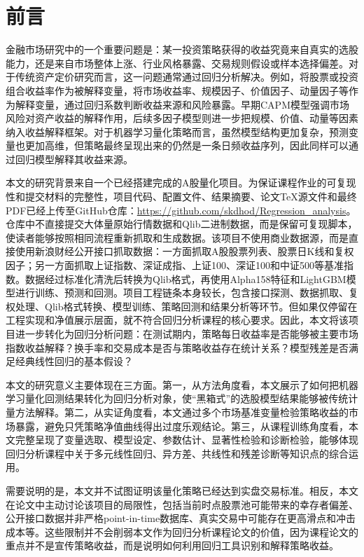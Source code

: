 \documentclass[UTF8,a4paper,12pt]{ctexart}
\begin{document}
\section{前言}
金融市场研究中的一个重要问题是：某一投资策略获得的收益究竟来自真实的选股能力，还是来自市场整体上涨、行业风格暴露、交易规则假设或样本选择偏差。对于传统资产定价研究而言，这一问题通常通过回归分析解决。例如，将股票或投资组合收益率作为被解释变量，将市场收益率、规模因子、价值因子、动量因子等作为解释变量，通过回归系数判断收益来源和风险暴露。早期CAPM模型强调市场风险对资产收益的解释作用\cite{sharpe1964}，后续多因子模型则进一步把规模、价值、动量等因素纳入收益解释框架\cite{fama1993,jegadeesh1993,carhart1997}。对于机器学习量化策略而言，虽然模型结构更加复杂，预测变量也更加高维，但策略最终呈现出来的仍然是一条日频收益序列，因此同样可以通过回归模型解释其收益来源。

本文的研究背景来自一个已经搭建完成的A股量化项目。为保证课程作业的可复现性和提交材料的完整性，项目代码、配置文件、结果摘要、论文TeX源文件和最终PDF已经上传至GitHub仓库：\url{https://github.com/skdhod/Regression_analysis}。仓库中不直接提交大体量原始行情数据和Qlib二进制数据，而是保留可复现脚本，使读者能够按照相同流程重新抓取和生成数据。该项目不使用商业数据源，而是直接使用新浪财经公开接口抓取数据：一方面抓取A股股票列表、股票日K线和复权因子；另一方面抓取上证指数、深证成指、上证100、深证100和中证500等基准指数。数据经过标准化清洗后转换为Qlib格式，再使用Alpha158特征和LightGBM模型进行训练、预测和回测。项目工程链条本身较长，包含接口探测、数据抓取、复权处理、Qlib格式转换、模型训练、策略回测和结果分析等环节。但如果仅停留在工程实现和净值展示层面，就不符合回归分析课程的核心要求。因此，本文将该项目进一步转化为回归分析问题：在测试期内，策略每日收益率是否能够被主要市场指数收益解释？换手率和交易成本是否与策略收益存在统计关系？模型残差是否满足经典线性回归的基本假设？

本文的研究意义主要体现在三方面。第一，从方法角度看，本文展示了如何把机器学习量化回测结果转化为回归分析对象，使“黑箱式”的选股模型结果能够被传统计量方法解释。第二，从实证角度看，本文通过多个市场基准变量检验策略收益的市场暴露，避免只凭策略净值曲线得出过度乐观结论。第三，从课程训练角度看，本文完整呈现了变量选取、模型设定、参数估计、显著性检验和诊断检验，能够体现回归分析课程中关于多元线性回归、异方差、共线性和残差诊断等知识点的综合运用。

需要说明的是，本文并不试图证明该量化策略已经达到实盘交易标准。相反，本文在论文中主动讨论该项目的局限性，包括当前时点股票池可能带来的幸存者偏差、公开接口数据并非严格point-in-time数据库、真实交易中可能存在更高滑点和冲击成本等。这些限制并不会削弱本文作为回归分析课程论文的价值，因为课程论文的重点并不是宣传策略收益，而是说明如何利用回归工具识别和解释策略收益。
\end{document}
